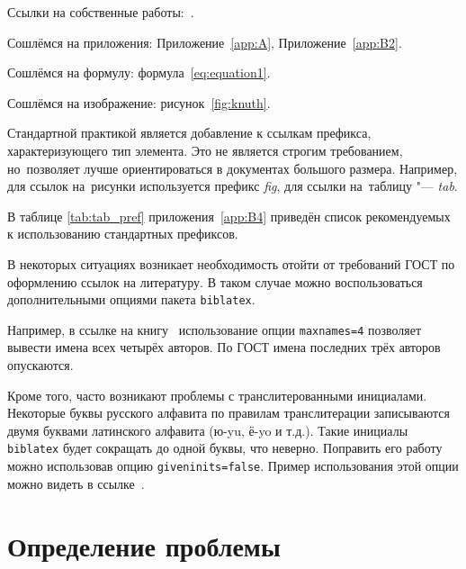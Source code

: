 %

Ссылки на собственные работы:~\cite{vakbib1, confbib1}.

Сошлёмся на приложения: Приложение~\cref{app:A}, Приложение~\cref{app:B2}.

Сошлёмся на формулу: формула~\cref{eq:equation1}.

Сошлёмся на изображение: рисунок~\cref{fig:knuth}.

Стандартной практикой является добавление к ссылкам префикса, характеризующего тип элемента.
Это не является строгим требованием, но~позволяет лучше ориентироваться в документах большого размера.
Например, для ссылок на~рисунки используется префикс \textit{fig},
для ссылки на~таблицу "--- \textit{tab}.

В таблице \cref{tab:tab_pref} приложения~\cref{app:B4} приведён список рекомендуемых
к использованию стандартных префиксов.

В некоторых ситуациях возникает необходимость отойти от требований ГОСТ по оформлению ссылок на
литературу.
В таком случае можно воспользоваться дополнительными опциями пакета \verb+biblatex+.

Например, в ссылке на книгу~\cite{sobenin_kdv} использование опции \verb+maxnames=4+ позволяет
вывести имена всех четырёх авторов.
По ГОСТ имена последних трёх авторов опускаются.

Кроме того, часто возникают проблемы с транслитерованными инициалами. Некоторые буквы русского
алфавита по правилам транслитерации записываются двумя буквами латинского алфавита (ю-yu, ё-yo и
т.д.).
Такие инициалы \verb+biblatex+ будет сокращать до одной буквы, что неверно.
Поправить его работу можно использовав опцию \verb+giveninits=false+.
Пример использования этой опции можно видеть в ссылке~\cite{initials}.

\section{Определение проблемы}\label{sec:ch1/sec3}
\cite{Shoji199895}

